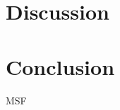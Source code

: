 \documentclass[11pt]{article}
\begin{document}
\newpage
\section{Discussion} %
\indent

\newpage
\section{Conclusion} MSF
\indent

 



\end{document}
